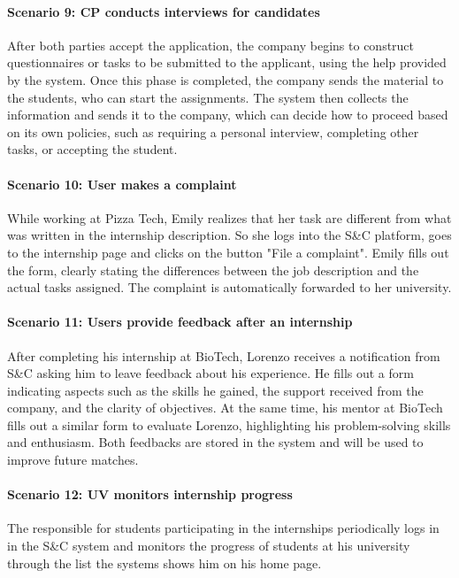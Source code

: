 \paragraph{Scenario 9: CP conducts interviews for candidates}
After both parties accept the application, the company begins to construct questionnaires or tasks to be submitted to the applicant, using the help provided by the system. Once this phase is completed, the company sends the material to the students, who can start the assignments. The system then collects the information and sends it to the company, which can decide how to proceed based on its own policies, such as requiring a personal interview, completing other tasks, or accepting the student.

\paragraph{Scenario 10: User makes a complaint}
While working at Pizza Tech, Emily realizes that her task are different from what was written in the internship description. So she logs into the S\&C platform, goes to the internship page and clicks on the button "File a complaint". Emily fills out the form, clearly stating the differences between the job description and the actual tasks assigned. The complaint is automatically forwarded to her university.

\paragraph{Scenario 11: Users provide feedback after an internship}
After completing his internship at BioTech, Lorenzo receives a notification from S\&C asking him to leave feedback about his experience. He fills out a form indicating aspects such as the skills he gained, the support received from the company, and the clarity of objectives. At the same time, his mentor at BioTech fills out a similar form to evaluate Lorenzo, highlighting his problem-solving skills and enthusiasm. Both feedbacks are stored in the system and will be used to improve future matches.

\paragraph{Scenario 12: UV monitors internship progress}
The responsible for students participating in the internships periodically logs in in the S\&C system and monitors the progress of students at his university through the list the systems shows him on his home page.

